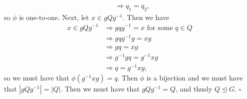 \documentclass{article}
\begin{document}
\begin{enumerate}
\begin{enumerate}
\begin{align*}
            &\Longrightarrow q_1=q_2,
        \end{align*}
        so $\phi$ is one-to-one. Next, let $x \in gQg^{-1}$. Then we have
        \begin{align*}
            x \in gQg^{-1} &\Longrightarrow gqg^{-1} = x \text{ for some } q \in Q \\
            &\Longrightarrow gqg^{-1}g = xg \\
            &\Longrightarrow gq = xg \\
            &\Longrightarrow g^{-1}gq = g^{-1}xg \\
            &\Longrightarrow q = g^{-1}xg,
        \end{align*}
        so we must have that $\phi(g^{-1}xg)=q$. Then $\phi$ is a bijection and we must have that $|gQg^{-1}| = |Q|$. Then we must have that 
        $gQg^{-1} = Q$, and thusly $Q \trianglelefteq G$. $\square$
    \end{enumerate}
\end{enumerate}
\newpage
\end{document}

